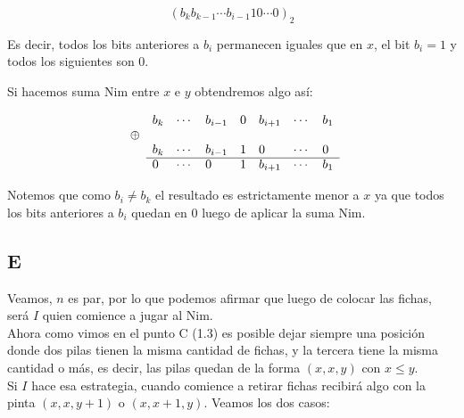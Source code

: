 \documentclass[a4paper]{article}
\begin{document}
$$(b_{k} b_{k-1}  \cdots b_{i-1}10\cdots0 )_{2}$$

Es decir, todos los bits anteriores a $b_{i}$ permanecen iguales que en $x$, el bit $b_{i} = 1$ y todos los siguientes son 0.

Si hacemos suma Nim entre $x$ e $y$ obtendremos algo así:

\begin{equation}
\begin{array}{lllllllll}
& b_{k} & \cdots & b_{i-1} & 0 & b_{i+1} &  \cdots & b_{1}\\
\oplus \\
& b_{k} & \cdots & b_{i-1} & 1 & 0 &  \cdots & 0\\
\cline{2-8}
& 0 & \cdots & 0 & 1 & b_{i+1} &  \cdots & b_{1}\\
\end{array}
\end{equation}

Notemos que como $b_{i} \not= b_{k} $ el resultado es estrictamente menor a $x$ ya que todos los bits anteriores a $b_{i}$ quedan en 0 luego de aplicar la suma Nim.






\subsection{E}

Veamos, $n$ es par, por lo que podemos afirmar que luego de colocar las fichas, será $I$ quien comience a jugar al Nim.\\

Ahora como vimos en el punto C (1.3) es posible dejar siempre una posición donde dos pilas tienen la misma cantidad de fichas, y la tercera tiene la misma cantidad o más, es decir,  las pilas quedan de la forma $(x, x, y)$ con $x \leq y$.\\

Si $I$ hace esa estrategia, cuando comience a retirar fichas recibirá algo con la pinta $(x,x,y+1)$ o $(x,x+1,y)$. Veamos los dos casos:
\end{document}
